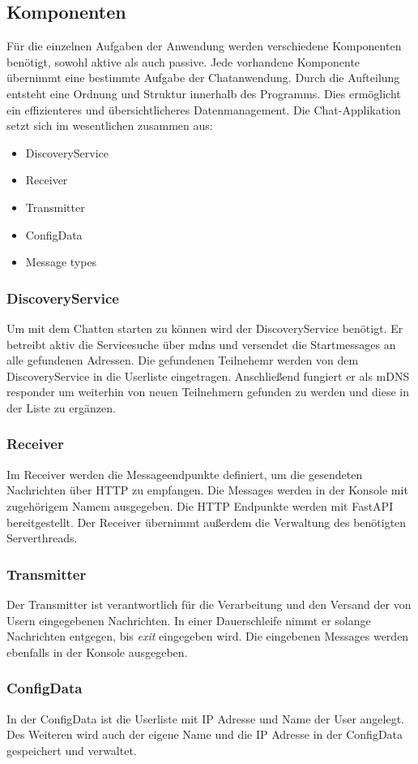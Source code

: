 \subsection{Komponenten} 
Für die einzelnen Aufgaben der Anwendung werden verschiedene Komponenten benötigt, sowohl aktive als auch passive. Jede vorhandene Komponente übernimmt eine bestimmte Aufgabe der Chatanwendung. 
Durch die Aufteilung entsteht eine Ordnung und Struktur innerhalb des Programms. Dies ermöglicht ein effizienteres und übersichtlicheres Datenmanagement.
Die Chat-Applikation setzt sich im wesentlichen zusammen aus:
\begin{itemize}
    \item DiscoveryService 
    \item Receiver
    \item Transmitter
    \item ConfigData
    \item Message types
\end{itemize} 
\subsubsection{DiscoveryService}
Um mit dem Chatten starten zu können wird der DiscoveryService benötigt. 
Er betreibt aktiv die Servicesuche über mdns und versendet die Startmessages an alle gefundenen Adressen. Die gefundenen Teilnehemr werden von dem DiscoveryService in die Userliste eingetragen. 
Anschließend fungiert er als mDNS responder um weiterhin von neuen Teilnehmern gefunden zu werden und diese in der Liste zu ergänzen. 
\subsubsection{Receiver}
Im Receiver werden die Messageendpunkte definiert, um die gesendeten Nachrichten über HTTP zu empfangen. 
Die Messages werden in der Konsole mit zugehörigem Namem ausgegeben.
Die HTTP Endpunkte werden mit FastAPI bereitgestellt. Der Receiver übernimmt außerdem die Verwaltung des benötigten Serverthreads.  
\subsubsection{Transmitter}
Der Transmitter ist verantwortlich für die Verarbeitung und den Versand der von Usern eingegebenen Nachrichten. 
In einer Dauerschleife nimmt er solange Nachrichten entgegen, bis \emph{exit} eingegeben wird. Die eingebenen Messages werden ebenfalls in der Konsole ausgegeben.
\subsubsection{ConfigData}
In der ConfigData ist die Userliste mit IP Adresse und Name der User angelegt. Des Weiteren wird auch der eigene Name und die IP Adresse in der ConfigData gespeichert und verwaltet.
